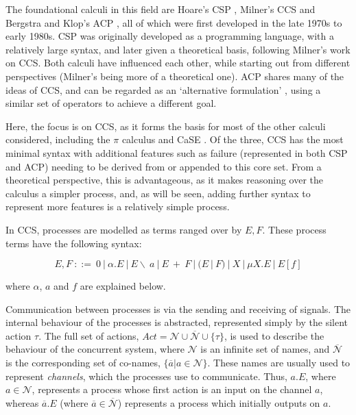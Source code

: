 The foundational calculi in this field are Hoare's CSP \cite{hoare:csp78},
Milner's CCS \cite{milner:ccs} and Bergstra and Klop's ACP \cite{acp}, all of
which were first developed in the late 1970s to early 1980s.  CSP was
originally developed as a programming language, with a relatively large
syntax, and later given a theoretical basis, following Milner's work on
CCS.  Both calculi have influenced each other, while starting out from
different perspectives (Milner's being more of a theoretical one).  ACP
shares many of the ideas of CCS, and can be regarded as an
`alternative formulation' \cite{acp}, using a similar set of operators
to achieve a different goal.

Here, the focus is on CCS, as it forms the basis for most of the other
calculi considered, including the $\pi$ calculus
\cite{picalctutorial} and CaSE \cite{CaSE}.  Of the three, CCS has the
most minimal syntax with additional features such as failure
(represented in both CSP and ACP) needing to be derived from or appended to
this core set.  From a theoretical perspective, this is advantageous, as
it makes reasoning over the calculus a simpler process, and, as will be
seen, adding further syntax to represent more features is a relatively
simple process.

In CCS, processes are modelled as terms ranged over by $E, F$.  These
process terms have the following syntax:

\begin{equation}
\label{ccssyntax}
  E, F\ ::=\ 
  0\ |\ 
  \alpha.E\ |\ 
  E\backslash\ a\ |\ 
  E\ +\ F\ |\ 
  (E\ |\ F)\ |\ 
  X\ |\ 
  \mu X.E\ |\ 
  E[f] 
\end{equation}

\noindent where $\alpha$, $a$ and $f$ are explained below.

Communication between processes is via the sending and receiving of
signals.  The internal behaviour of the processes is abstracted,
represented simply by the silent action $\tau$.  The full set of
actions, $Act = \mathcal{N} \cup \overline{\mathcal{N}} \cup
\{\tau\}$, is used to describe the behaviour of the concurrent system,
where $\mathcal{N}$ is an infinite set of names, and
$\overline{\mathcal{N}}$ is the corresponding set of co-names,
$\{\overline{a} | a \in \mathcal{N}\}$.  These names are usually used
to represent \emph{channels}, which the processes use to communicate.
Thus, $a.E$, where $a \in \mathcal{N}$, represents a process whose
first action is an input on the channel $a$, whereas $\overline{a}.E$
(where $\overline{a} \in \overline{\mathcal{N}}$) represents a process
which initially outputs on $a$.

